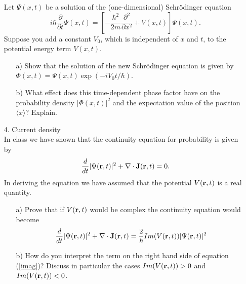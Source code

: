 \documentclass[11pt]{article}
\begin{document}
\begin{itemize}
Let $\Psi(x,t)$ be a solution of the (one-dimensional) Schr\"odinger equation
\begin{equation}
i\hbar \frac{\partial}{\partial t}\Psi(x,t) =
\left[-\frac{\hbar^2}{2m}\frac{\partial^2}{\partial x^2}+V(x,t)\right]
\Psi(x,t).
\end{equation}
Suppose you add a constant $V_0$, which is independent of $x$ and $t$,
to the potential energy term $V(x,t)$.
\begin{itemize}
\item[a)] Show that the solution of the new Schr\"odinger equation is given by\\
$\Phi(x,t) = \Psi(x,t) \exp(-iV_0t/\hbar)$.
\item[b)] What effect does this time-dependent phase factor have on the
probability density $|\Phi(x,t)|^2$ and the expectation value of the position $\langle x \rangle$?
Explain.
\end{itemize}
%
\item[4.] Current density\\
In class we have shown that the continuity equation for probability is given by
\begin{equation}
\frac{d}{dt}|\Psi({\bf r},t)|^2 +{\bf \nabla} \cdot{\bf J}({\bf r},t) = 0.
\end{equation}
In deriving the equation we have assumed that the potential $V({\bf r},t)$ is a real
quantity.
\begin{itemize}
\item[a)]
Prove that if $V({\bf r},t)$ would be complex the continuity equation would become
\begin{equation}\label{imag}
\frac{d}{dt}|\Psi({\bf r},t)|^2 +{\bf \nabla} \cdot{\bf J}({\bf r},t) =
\frac{2}{\hbar} Im(V({\bf r},t)) |\Psi({\bf r},t)|^2
\end{equation}
\item[b)]
How do you interpret the term on the right hand side of equation (\ref{imag})? Discuss in particular
the cases $Im(V({\bf r},t))>0$ and  $Im(V({\bf r},t))<0$.
\end{itemize}
%
\end{itemize}
%
\end{document}
